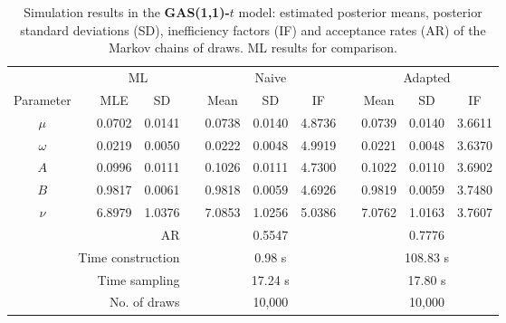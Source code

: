 { \renewcommand{\arraystretch}{1.2} 
\begin{table}[h] 
\footnotesize
\centering 
\caption{Simulation results in the \textbf{GAS(1,1)-$t$} model: estimated posterior means, posterior standard deviations (SD), inefficiency factors (IF) and acceptance rates (AR) of the Markov chains of draws. ML results for comparison.} 
\label{tab:posterior_t_gas} 
\begin{tabular}{cc rr c rrr c rrr}  
 & & \multicolumn{2}{c}{ML} & & \multicolumn{3}{c}{Naive} & & \multicolumn{3}{c}{Adapted} \\  \cline{3-4} \cline{6-8} \cline{10-12} 
 Parameter & &  \multicolumn{1}{c}{MLE} &  \multicolumn{1}{c}{SD}  & &  \multicolumn{1}{c}{Mean} &  \multicolumn{1}{c}{SD} &  \multicolumn{1}{c}{IF} & &  \multicolumn{1}{c}{Mean} &  \multicolumn{1}{c}{SD} &  \multicolumn{1}{c}{IF} \\ \cline{1-1}  \cline{3-4} \cline{6-8} \cline{10-12}  
$\mu$ & & 0.0702 &  0.0141 & & 0.0738 &  0.0140 &  4.8736 & & 0.0739 &  0.0140 &  3.6611 \\ [1ex] 
$\omega$ & & 0.0219 &  0.0050 & & 0.0222 &  0.0048 &  4.9919 & & 0.0221 &  0.0048 &  3.6370 \\ [1ex] 
$A$ & & 0.0996 &  0.0111 & & 0.1026 &  0.0111 &  4.7300 & & 0.1022 &  0.0110 &  3.6902 \\ [1ex] 
$B$ & & 0.9817 &  0.0061 & & 0.9818 &  0.0059 &  4.6926 & & 0.9819 &  0.0059 &  3.7480 \\ [1ex] 
$\nu$ & & 6.8979 &  1.0376 & & 7.0853 &  1.0256 &  5.0386 & & 7.0762 &  1.0163 &  3.7607 \\ [1ex] 
\cline{1-1}  \cline{3-4} \cline{6-8} \cline{10-12}   
\multicolumn{4}{r}{AR} & &\multicolumn{3}{c}{0.5547} &&\multicolumn{3}{c}{0.7776} \\ 
  \cline{1-4} \cline{6-8} \cline{10-12}  
 \multicolumn{4}{r}{Time construction} & &\multicolumn{3}{c}{0.98 s} &&\multicolumn{3}{c}{108.83 s} \\ 
   \multicolumn{4}{r}{Time sampling} & &\multicolumn{3}{c}{17.24 s} &&\multicolumn{3}{c}{17.80 s} \\ 
   \multicolumn{4}{r}{No. of draws }& &\multicolumn{3}{c}{10,000} &&\multicolumn{3}{c}{10,000} \\ 
  \cline{1-4} \cline{6-8} \cline{10-12} 
\hline 
\end{tabular} 
\end{table} 
}
\normalsize
